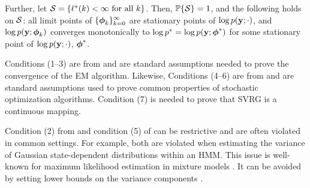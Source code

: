 \begin{theorem}
    Further, let $\mathcal{S} = \{\ell^*(k) < \infty \text{ for all } k \}$. Then, $\mathbb{P}\{\mathcal{S}\} = 1$, and the following holds on $\mathcal{S}$: all limit points of $\{\boldsymbol{\phi}_{k}\}_{k=0}^\infty$  are stationary points of $\log p(\mathbf{y};\cdot)$, and $\log p(\mathbf{y};\boldsymbol{\phi}_{k})$ converges monotonically to $\log p^* = \log p(\mathbf{y};\boldsymbol{\phi}^*)$ for some stationary point of $\log p(\mathbf{y};\cdot)$, $\boldsymbol{\phi}^*$.
\end{theorem}
%




Conditions (1--3) are from \citet{Wu:1983} and are standard assumptions needed to prove the convergence of the EM algorithm. Likewise, Conditions (4--6) are from \citet{Johnson:2013} and are standard assumptions used to prove common properties of stochastic optimization algorithms. Condition (7) is needed to prove that SVRG is a continuous mapping.

Condition (2) from \citet{Wu:1983} and condition (5) of \citet{Johnson:2013} can be restrictive and are often violated in common settings. For example, both are violated when estimating the variance of Gaussian state-dependent distributions within an HMM. This issue is well-known for maximum likelihood estimation in mixture models \citep{Chen:2009,Liu:2015b}. It can be avoided by setting lower bounds on the variance components \citep{Zucchini:2016}. %

